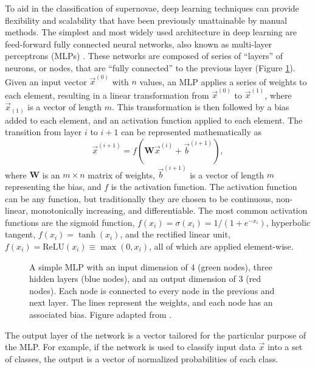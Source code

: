 To aid in the classification of supernovae, deep learning techniques can provide 
flexibility and scalability that have been previously unattainable by manual 
methods. The simplest and most widely used architecture in deep learning are feed-forward 
fully connected neural networks, also known as multi-layer perceptrons (MLPs) \parencite{popescu2009}.
These networks are composed of series of ``layers'' of neurons, or nodes, that 
are ``fully connected'' to the previous layer (Figure \ref{fig:MLP}).
Given an input vector $\vec{x}^{(0)}$ with $n$ values, an MLP applies a series of weights to each 
element, resulting in a linear transformation from $\vec{x}^{(0)}$ to $\vec{x}^{(1)}$, where
$\vec{x}_{(1)}$ is a vector of length $m$. This transformation is then followed by a bias added 
to each element, and an activation function applied to each element.
The transition from layer $i$ to $i+1$ can be represented mathematically as 
\begin{equation}\label{eqn:MLP}
    \vec{x}^{(i+1)} = f(\mathbf{W}\vec{x}^{(i)} + \vec{b}^{(i+1)}),
\end{equation}
where $\mathbf{W}$ is an $m \times n$ matrix of weights, $\vec{b}^{(i+1)}$ is a vector of length $m$
representing the bias, and $f$ is the activation function. The activation function can 
be any function, but traditionally they are chosen to be continuous, non-linear, 
monotonically increasing, and differentiable. The most common activation functions 
are the sigmoid function, $f(x_i) = \sigma(x_i) = 1/(1 + e^{-x_i})$, hyperbolic tangent, 
$f(x_i) = \tanh(x_i)$, and the rectified linear unit,
$f(x_i) = \mathrm{ReLU}(x_i) \equiv \max(0,x_i)$, all of which are applied element-wise.
\begin{figure}[t]
    \centering
    
    \caption[Diagram of a Multi-Layered Perceptron]{A simple MLP with an input dimension of 4 (green nodes), three hidden layers (blue nodes), and an output dimension of 3 (red nodes). Each node is connected to every 
    node in the previous and next layer. The lines represent the weights, and each 
    node has an associated bias. Figure adapted from \textcite{neutelings2021_nn}.}
    \label{fig:MLP}
\end{figure}
The output layer of the network is a vector tailored for the particular purpose
of the MLP. For example, if the network is used to classify input data $\vec{x}$ into a set of classes, the output is a vector of normalized probabilities of each class. 


